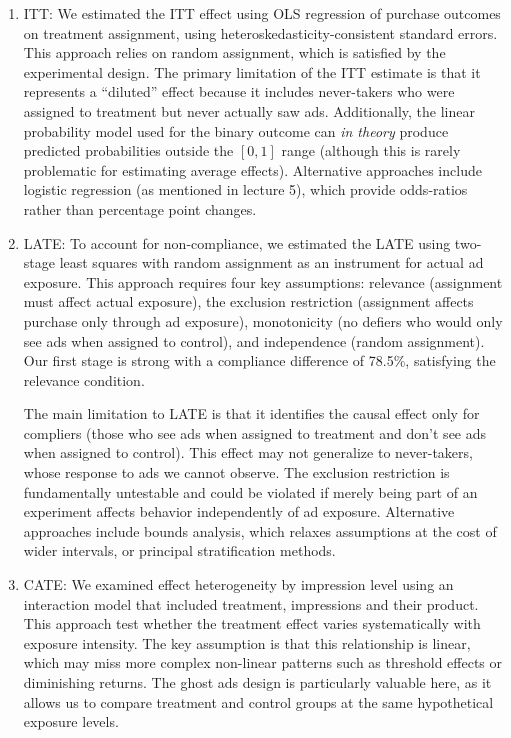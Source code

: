 \documentclass[10pt]{article}
\begin{document}
\begin{enumerate}
    \item ITT: We estimated the ITT effect using OLS regression of purchase outcomes on treatment assignment, using heteroskedasticity-consistent standard errors. This approach relies on random assignment, which is satisfied by the experimental design. The primary limitation of the ITT estimate is that it represents a ``diluted'' effect because it includes never-takers who were assigned to treatment but never actually saw ads. Additionally, the linear probability model used for the binary outcome can \textit{in theory} produce predicted probabilities outside the $[0, 1] $ range (although this is rarely problematic for estimating average effects). Alternative approaches include logistic regression (as mentioned in lecture 5), which provide odds-ratios rather than percentage point changes. 
    \item LATE: To account for non-compliance, we estimated the LATE using two-stage least squares with random assignment as an instrument for actual ad exposure. This approach requires four key assumptions: relevance (assignment must affect actual exposure), the exclusion restriction (assignment affects purchase only through ad exposure), monotonicity (no defiers who would only see ads when assigned to control), and independence (random assignment). Our first stage is strong with a compliance difference of 78.5\%, satisfying the relevance condition. 

    The main limitation to LATE is that it identifies the causal effect only for compliers (those who see ads when assigned to treatment and don't see ads when assigned to control). This effect may not generalize to never-takers, whose response to ads we cannot observe. The exclusion restriction is fundamentally untestable and could be violated if merely being part of an experiment affects behavior independently of ad exposure. Alternative approaches include bounds analysis, which relaxes assumptions at the cost of wider intervals, or principal stratification methods. 
    \item CATE: We examined effect heterogeneity by impression level using an interaction model that included treatment, impressions and their product. This approach test whether the treatment effect varies systematically with exposure intensity. The key assumption is that this relationship is linear, which may miss more complex non-linear patterns such as threshold effects or diminishing returns. The ghost ads design is particularly valuable here, as it allows us to compare treatment and control groups at the same hypothetical exposure levels. 
    

\end{enumerate}
\end{document}

